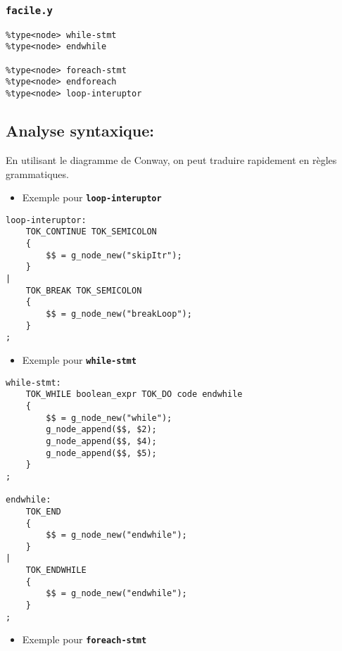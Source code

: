 \documentclass[11pt]{article}
\providecommand{\tightlist}{%
      \setlength{\itemsep}{0pt}\setlength{\parskip}{0pt}}
\begin{document}
\hypertarget{facile.y}{%
\subsubsection{\texorpdfstring{\texttt{facile.y}}{facile.y}}\label{facile.y}}

\begin{verbatim}
%type<node> while-stmt
%type<node> endwhile

%type<node> foreach-stmt
%type<node> endforeach
%type<node> loop-interuptor
\end{verbatim}

    \hypertarget{analyse-syntaxique}{%
\subsection{Analyse syntaxique:}\label{analyse-syntaxique}}

En utilisant le diagramme de Conway, on peut traduire rapidement en
règles grammatiques.

\begin{itemize}
\tightlist
\item
  Exemple pour \textbf{\texttt{loop-interuptor}}
\end{itemize}

\begin{verbatim}
loop-interuptor:
    TOK_CONTINUE TOK_SEMICOLON
    {
        $$ = g_node_new("skipItr");
    }
|
    TOK_BREAK TOK_SEMICOLON
    {
        $$ = g_node_new("breakLoop");
    }
;
\end{verbatim}

\begin{itemize}
\tightlist
\item
  Exemple pour \textbf{\texttt{while-stmt}}
\end{itemize}

\begin{verbatim}
while-stmt:
    TOK_WHILE boolean_expr TOK_DO code endwhile
    {
        $$ = g_node_new("while");
        g_node_append($$, $2);
        g_node_append($$, $4);
        g_node_append($$, $5);
    }
;

endwhile:
    TOK_END
    {
        $$ = g_node_new("endwhile");
    }
|
    TOK_ENDWHILE
    {
        $$ = g_node_new("endwhile");
    }
;
\end{verbatim}

\begin{itemize}
\tightlist
\item
  Exemple pour \textbf{\texttt{foreach-stmt}}
\end{itemize}
\end{document}
